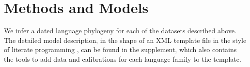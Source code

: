 \documentclass[a4paper,12pt]{scrartcl}
\begin{document}

\section{Methods and Models}
We infer a dated language phylogeny for each of the datasets described above.
The detailed model description, in the shape of an XML template file in the
style of literate programming \parencite{knuth1984literate}, can be found in the supplement,
which also contains the tools to add data and calibrations for each language
family to the template.
\end{document}
